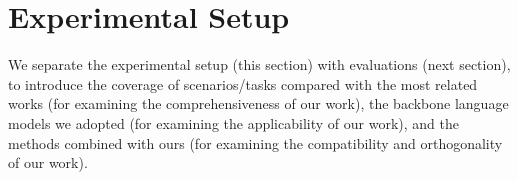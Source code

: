 \section{Experimental Setup}
\label{sec:experiments}






We separate the experimental setup (this section) with evaluations (next section), to introduce the coverage of scenarios/tasks compared with the most related works (for examining the comprehensiveness of our work), the backbone language models we adopted (for examining the applicability of our work), and the methods combined with ours (for examining the compatibility and orthogonality of our work). 




